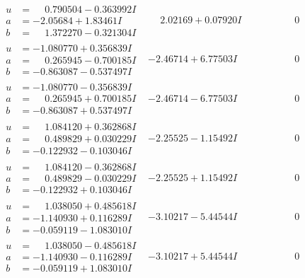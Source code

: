 \documentclass[1p]{elsarticle_modified}
\theoremstyle{definition}
\begin{document}
$$\begin{array}{c|c|c}
\begin{aligned}
u &= \phantom{-}0.790504 - 0.363992 I \\
a &= -2.05684 + 1.83461 I \\
b &= \phantom{-}1.372270 - 0.321304 I\end{aligned}
 & \phantom{-}2.02169 + 0.07920 I & \phantom{-0.000000 } 0 \\ \hline\begin{aligned}
u &= -1.080770 + 0.356839 I \\
a &= \phantom{-}0.265945 - 0.700185 I \\
b &= -0.863087 - 0.537497 I\end{aligned}
 & -2.46714 + 6.77503 I & \phantom{-0.000000 } 0 \\ \hline\begin{aligned}
u &= -1.080770 - 0.356839 I \\
a &= \phantom{-}0.265945 + 0.700185 I \\
b &= -0.863087 + 0.537497 I\end{aligned}
 & -2.46714 - 6.77503 I & \phantom{-0.000000 } 0 \\ \hline\begin{aligned}
u &= \phantom{-}1.084120 + 0.362868 I \\
a &= \phantom{-}0.489829 + 0.030229 I \\
b &= -0.122932 - 0.103046 I\end{aligned}
 & -2.25525 - 1.15492 I & \phantom{-0.000000 } 0 \\ \hline\begin{aligned}
u &= \phantom{-}1.084120 - 0.362868 I \\
a &= \phantom{-}0.489829 - 0.030229 I \\
b &= -0.122932 + 0.103046 I\end{aligned}
 & -2.25525 + 1.15492 I & \phantom{-0.000000 } 0 \\ \hline\begin{aligned}
u &= \phantom{-}1.038050 + 0.485618 I \\
a &= -1.140930 + 0.116289 I \\
b &= -0.059119 - 1.083010 I\end{aligned}
 & -3.10217 - 5.44544 I & \phantom{-0.000000 } 0 \\ \hline\begin{aligned}
u &= \phantom{-}1.038050 - 0.485618 I \\
a &= -1.140930 - 0.116289 I \\
b &= -0.059119 + 1.083010 I\end{aligned}
 & -3.10217 + 5.44544 I & \phantom{-0.000000 } 0 \\ \hline\begin{aligned}

\end{aligned}
\end{array}$$
\end{document}
